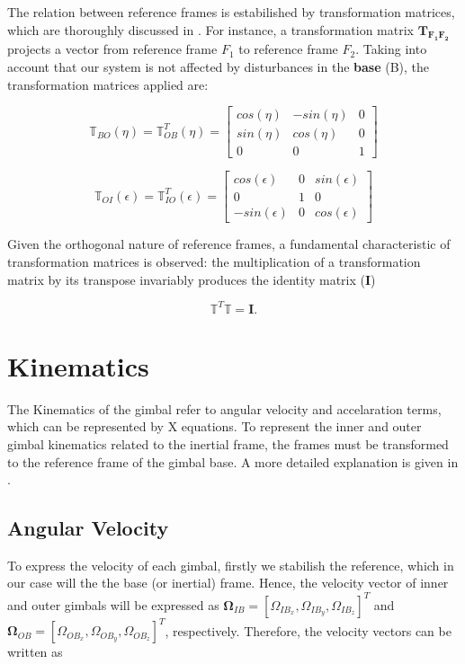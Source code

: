  The relation between reference frames is estabilished by transformation matrices, which are thoroughly discussed in \cite{Done_1999}. For instance, a transformation matrix $\mathbf{T_{F_1 F_2}}$ projects a vector from reference frame $F_1$ to reference frame $F_2$. Taking into account that our system is not affected by disturbances in the \textbf{base} (B), the transformation matrices applied are:

 \begin{equation}
    \mathbb{T}_{BO}(\eta) = \mathbb{T}^T_{OB}(\eta) = \left[\begin{matrix} cos(\eta) & -sin(\eta) & 0 \\ sin(\eta) & cos(\eta) & 0 \\ 0 & 0 & 1 \end{matrix}\right]
 \end{equation}

  \begin{equation}
    \mathbb{T}_{OI}(\epsilon) = \mathbb{T}^T_{IO}(\epsilon) = \left[\begin{matrix} cos(\epsilon) & 0 & sin(\epsilon) \\ 0 & 1 & 0 \\ -sin(\epsilon) & 0 & cos(\epsilon) \end{matrix}\right]
 \end{equation}

 Given the orthogonal nature of reference frames, a fundamental characteristic of transformation matrices is observed: the multiplication of a transformation matrix by its transpose invariably produces the identity matrix ($\mathbf{I}$)

\begin{equation}
   \label{equacaoidentidade}
   \mathbb{T}^T\mathbb{T} = \mathbf{I}.
\end{equation}

 \section{Kinematics}
 The Kinematics of the gimbal refer to angular velocity and accelaration terms, which can be represented by X equations. To represent the inner and outer gimbal kinematics related to the inertial frame, the frames must be transformed to the reference frame of the gimbal base. A more detailed explanation is given in .
 
 \subsection{Angular Velocity}
To express the velocity of each gimbal, firstly we stabilish the reference, which in our case will the the base (or inertial) frame. Hence, the velocity vector of inner and outer gimbals will be expressed as $\mathbf{\Omega}_{IB} = [\Omega_{IB_x},\Omega_{IB_y},\Omega_{IB_z}]^T$ and $\mathbf{\Omega}_{OB} = [\Omega_{OB_x},\Omega_{OB_y},\Omega_{OB_z}]^T$, respectively. Therefore, the velocity vectors can be written as

